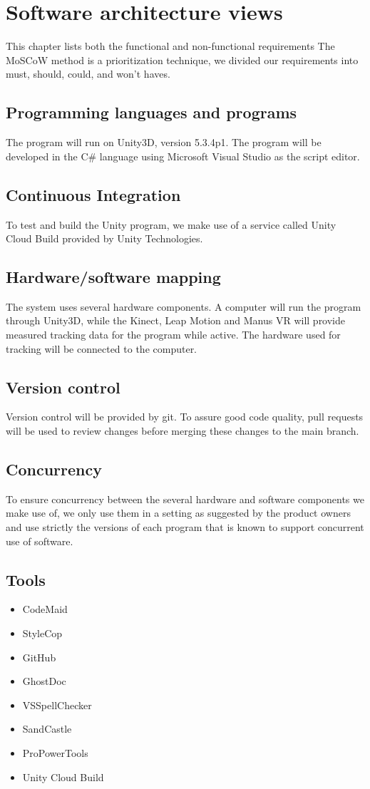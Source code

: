 \documentclass[11pt,a4paper]{report}
\begin{document}
\chapter{ Software architecture views}
This chapter lists both the functional and non-functional requirements
The MoSCoW method is a prioritization technique, we divided our requirements into must, should, could, and won't haves. 
\section{Programming languages and programs}
The program will run on Unity3D, version 5.3.4p1. The program will be developed in the C\#
language using Microsoft Visual Studio as the script editor.
\section{Continuous Integration}
To test and build the Unity program, we make use of a service called Unity Cloud Build
provided by Unity Technologies.
\section{Hardware/software mapping}
The system uses several hardware components. A computer will run the program through
Unity3D, while the Kinect, Leap Motion and Manus VR will provide measured tracking data
for the program while active. The hardware used for tracking will be connected to the
computer.

\section{Version control}
Version control will be provided by git. To assure good code quality, pull requests will be
used to review changes before merging these changes to the main branch.
\section{Concurrency}
To ensure concurrency between the several hardware and software components we make use
of, we only use them in a setting as suggested by the product owners and use 
strictly the
versions of each program that is known to support concurrent use of software.
\section{Tools}
\begin{itemize}
\item CodeMaid
\item StyleCop
\item GitHub
\item GhostDoc
\item VSSpellChecker
\item SandCastle
\item ProPowerTools
\item Unity Cloud Build
\end{itemize}
\end{document}
